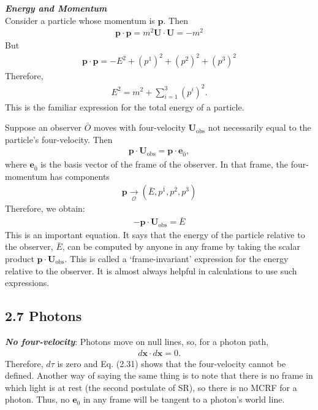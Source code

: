 \documentclass[11pt,letterpaper]{book}
\begin{document}
    \textit{\textbf{Energy and Momentum}}\\
        Consider a particle whose momentum is \( \mathbf{p} \). Then
        \begin{align}
        \mathbf{p} \cdot \mathbf{p} = m^2 \mathbf{U} \cdot \mathbf{U} = -m^2
        \end{align}
        But
        \begin{align}
        \mathbf{p} \cdot \mathbf{p} = -E^2 + (p^1)^2 + (p^2)^2 + (p^3)^2
        \end{align}
        Therefore,
        \begin{align}
        E^2 = m^2 + \sum_{i=1}^{3} (p^i)^2.
        \end{align}
        This is the familiar expression for the total energy of a particle.
        
        Suppose an observer \( \bar{O} \) moves with four-velocity \( \mathbf{U}_{\text{obs}} \) not necessarily equal to the particle’s four-velocity. Then
        \begin{align}
        \mathbf{p} \cdot \mathbf{U}_{\text{obs}} = \mathbf{p} \cdot \mathbf{e}_{\bar{0}},
        \end{align}
        where \( \mathbf{e}_{\bar{0}} \) is the basis vector of the frame of the observer. In that frame, the four-momentum has components
        \begin{align}
        \mathbf{p} \underset{\mathcal{O}}{\rightarrow} (\bar{E}, p^{\bar{1}}, p^{\bar{2}}, p^{\bar{3}})
        \end{align}
        Therefore, we obtain:
        \begin{align}
        - \mathbf{p} \cdot \mathbf{U}_{\text{obs}} = \bar{E}
        \end{align}
        This is an important equation. It says that the energy of the particle relative to the observer, \( \bar{E} \), can be computed by anyone in any frame by taking the scalar product \( \mathbf{p} \cdot \mathbf{U}_{\text{obs}} \). This is called a ‘frame-invariant’ expression for the energy relative to the observer. It is almost always helpful in calculations to use such expressions.\\

    \subsection{2.7 Photons }

        \textit{\textbf{No four-velocity}}: Photons move on null lines, so, for a photon path,
        \begin{align}
        d\mathbf{x} \cdot d\mathbf{x} = 0.
        \end{align}
        Therefore, \( d\tau \) is zero and Eq. (2.31) shows that the four-velocity cannot be defined. Another way of saying the same thing is to note that there is no frame in which light is at rest (the second postulate of SR), so there is no MCRF for a photon. Thus, no \( \mathbf{e}_0 \) in any frame will be tangent to a photon’s world line.
        
\end{document}
